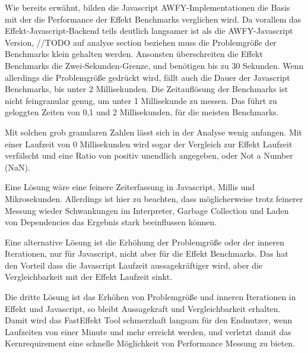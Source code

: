 Wie bereits erwähnt, bilden die Javascript AWFY-Implementationen die Basis mit der die Performance der Effekt Benchmarks verglichen wird.
Da vorallem das Effekt-Javascript-Backend teils deutlich langsamer ist als die AWFY-Javascript Version, //TODO auf analyse section beziehen
 muss die Problemgröße der Benchmarks klein gehalten werden. Ansonsten überschreiten die Effekt Benchmarks die Zwei-Sekunden-Grenze, und benötigen bis zu 30 Sekunden. Wenn allerdings die Problemgröße gedrückt wird, fällt auch die Dauer der Javascript Benchmarks, bis unter 2 Millisekunden. Die Zeitauflösung der Benchmarks ist nicht feingranular genug, um unter 1 Millisekunde zu messen. Das führt zu geloggten Zeiten von 0,1 und 2 Millisekunden, für die meisten Benchmarks. 

Mit solchen grob granularen Zahlen lässt sich in der Analyse wenig anfangen. Mit einer Laufzeit von 0 Millisekunden wird sogar der Vergleich zur Effekt Laufzeit verfälscht und eine Ratio von positiv unendlich angegeben, oder Not a Number (NaN).

Eine Lösung wäre eine feinere Zeiterfassung in Javascript, Millis und Mikrosekunden. Allerdings ist hier zu beachten, dass möglicherweise trotz feinerer Messung wieder Schwankungen im Interpreter, Garbage Collection und Laden von Dependencies das Ergebnis stark beeinflussen können.

Eine alternative Lösung ist die Erhöhung der Problemgröße oder der inneren Iterationen, nur für Javascript, nicht aber für die Effekt Benchmarks.
Das hat den Vorteil dass die Javascript Laufzeit aussagekräftiger wird, aber die Vergleichbarkeit mit der Effekt Laufzeit sinkt.

Die dritte Lösung ist das Erhöhen von Problemgröße und inneren Iterationen in Effekt und Javascript, so bleibt Aussagekraft und Vergleichbarkeit erhalten.
Damit wird das FastEffekt Tool schmerzhaft langsam für den Endnutzer, wenn Laufzeiten von einer Minute und mehr erreicht werden, und verletzt damit das Kernrequirement eine schnelle Möglichkeit von Performance Messung zu bieten.
